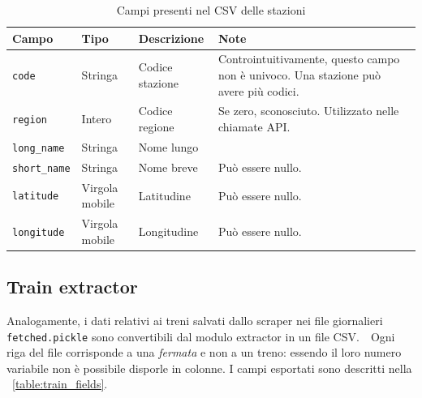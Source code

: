 \documentclass[12pt,italian]{report}
\begin{document}
\begin{table}[h] \small
    \begin{tabular}{m{2cm} || m{1.7cm} | m{3cm} | m{6cm}}
      \textbf{Campo} & \textbf{Tipo} & \textbf{Descrizione} & \textbf{Note} \\
      \hline \texttt{code} & Stringa & Codice stazione & Controintuitivamente,
                                                         questo campo non è
                                                         univoco. Una
                                                         stazione può avere
                                                         più codici. \\
      \hline \texttt{region} & Intero & Codice regione & Se zero,
                                                         sconosciuto.
                                                         Utilizzato nelle
                                                         chiamate API.\\
      \hline \texttt{long\_name} & Stringa & Nome lungo & \\
      \hline \texttt{short\_name} & Stringa & Nome breve & Può essere nullo.
      \\ \hline \texttt{latitude} & Virgola mobile & Latitudine & Può essere
                                                                  nullo. \\
      \hline \texttt{longitude} & Virgola mobile & Longitudine & Può essere
                                                                 nullo.
    \end{tabular}
    \caption{Campi presenti nel CSV delle stazioni}
    \label{table:station_fields}
\end{table}

\subsection{Train extractor}

Analogamente, i dati relativi ai treni salvati dallo scraper nei file
giornalieri \texttt{fetched\-.pickle} sono convertibili dal modulo
extractor in un file CSV.\ \ Ogni riga del file corrisponde a una
\textit{fermata} e non a un treno: essendo il loro numero variabile
non è possibile disporle in colonne.  I campi esportati sono descritti
nella \tablename\ \ref{table:train_fields}.
\end{document}
